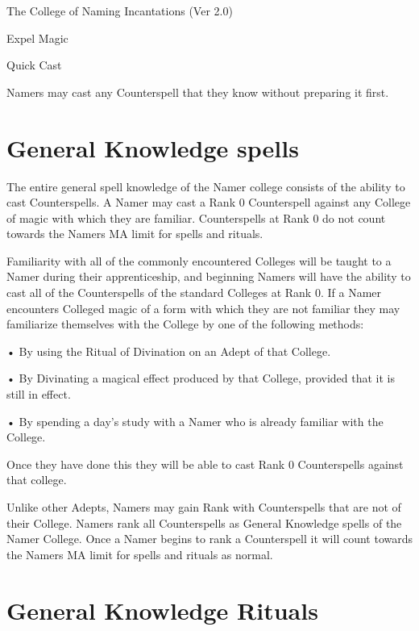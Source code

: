 \begin{Chapter}{The College of Naming Incantations (Ver 2.0)}
\begin{talent}[T-2]{Expel Magic }
\begin{effects}
\end{effects}
\end{talent}

\begin{talent}[T-3]{Quick Cast }

\begin{effects}
 Namers  may  cast  any  Counterspell  that 
they know without preparing it first. 


\end{effects}
\end{talent}

\section{General Knowledge spells}

The  entire  general  spell  knowledge  of  the  Namer 
college consists of the ability to cast Counterspells. 
A  Namer  may  cast  a  Rank  0  Counterspell  against 
any College of magic with which they are familiar. 
Counterspells  at  Rank  0  do  not  count  towards  the 
Namers MA limit for spells and rituals. 

Familiarity  with  all  of  the  commonly  encountered 
Colleges  will  be  taught  to  a  Namer  during  their 
apprenticeship,  and  beginning  Namers  will  have 
the  ability  to  cast  all  of  the  Counterspells  of  the 
standard Colleges at Rank 0. If a Namer encounters 
Colleged magic of a form with which they are not 
familiar  they  may  familiarize  themselves  with  the 
College by one of the following methods:  

• By using the Ritual of Divination on an Adept of 
that College.  

•  By  Divinating  a  magical  effect  produced  by  that 
College, provided that it is still in effect.  

•  By  spending  a day’s  study  with  a Namer  who  is 
already familiar with the College. 

Once they have done this they  will be able to cast 
Rank 0 Counterspells against that college. 

Unlike other Adepts, Namers may gain Rank with Counterspells that are
not of their College. Namers rank all Counterspells as General
Knowledge spells of the Namer College.  Once a Namer begins to rank a
Counterspell it will count towards the Namers MA limit for spells and
rituals as normal.



\section{General Knowledge Rituals}



\end{Chapter}

